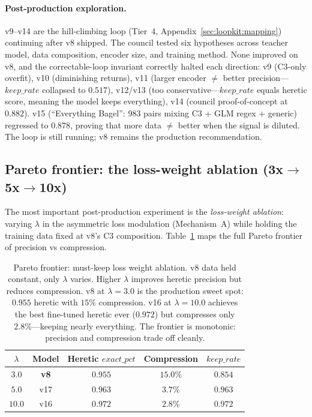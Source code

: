 \paragraph{Post-production exploration.} v9--v14 are the hill-climbing loop
(Tier~4, Appendix~\ref{sec:loopkit:mapping}) continuing after v8 shipped.
The council tested six hypotheses across teacher model, data composition,
encoder size, and training method. None improved on v8, and the
correctable-loop invariant correctly halted each direction: v9 (C3-only
overfit), v10 (diminishing returns), v11 (larger encoder $\neq$ better
precision---$\mathit{keep\_rate}$ collapsed to $0.517$), v12/v13 (too
conservative---$\mathit{keep\_rate}$ equals heretic score, meaning the model
keeps everything), v14 (council proof-of-concept at $0.882$). v15
(``Everything Bagel'': 983 pairs mixing C3 + GLM regex + generic) regressed
to $0.878$, proving that more data $\neq$ better when the signal is
diluted. The loop is still running; v8 remains the production recommendation.

\subsection{Pareto frontier: the loss-weight ablation (3x$\to$5x$\to$10x)}
\label{sec:eval:pareto}

The most important post-production experiment is the \emph{loss-weight
ablation}: varying $\lambda$ in the asymmetric loss modulation
(Mechanism~A) while holding the training data fixed at v8's C3 composition.
Table~\ref{tab:pareto} maps the full Pareto frontier of precision vs
compression.

\begin{table}[h]
\centering
\caption{Pareto frontier: must-keep loss weight ablation. v8 data held
constant, only $\lambda$ varies. Higher $\lambda$ improves heretic precision
but reduces compression. v8 at $\lambda{=}3.0$ is the production sweet spot:
$0.955$ heretic with $15\%$ compression. v16 at $\lambda{=}10.0$ achieves the
best fine-tuned heretic ever ($0.972$) but compresses only $2.8\%$---keeping
nearly everything. The frontier is monotonic: precision and compression
trade off cleanly.}
\label{tab:pareto}
\begin{tabular}{ccccc}
\toprule
$\lambda$ & Model & Heretic $\mathit{exact\_pct}$ & Compression & $\mathit{keep\_rate}$ \\
\midrule
$3.0$  & \textbf{v8}  & $0.955$ & $15.0\%$  & $0.854$ \\
$5.0$  & v17          & $0.963$ & $3.7\%$   & $0.963$ \\
$10.0$ & v16          & $0.972$ & $2.8\%$   & $0.972$ \\
\bottomrule
\end{tabular}
\end{table}

